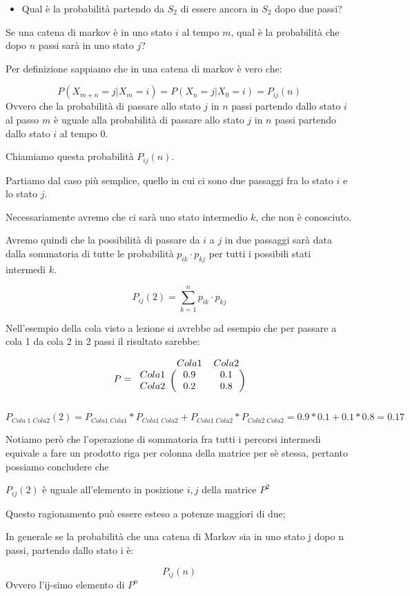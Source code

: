 \documentclass{article}
\begin{document}
\begin{itemize}
	\item Qual è la probabilità partendo da $S_2$ di essere ancora in $S_2$ dopo due passi?
\end{itemize}

\pagebreak
\begin{mdframed}[hidealllines=true,backgroundcolor=blue!20]
	Se una catena di markov è in uno stato $i$ al tempo $m$, qual è la probabilità che dopo $n$ passi sarà in uno stato $j$?
	
	Per definizione sappiamo che in una catena di markov è vero che:
	
	\[
		P(X_{m + n} = j | X_m = i) = P(X_{n} = j | X_0 = i) = P_{ij}(n)
	\]
	Ovvero che la probabilità di passare allo stato $j$ in $n$ passi partendo dallo stato $i$ al passo $m$ è uguale alla probabilità di passare allo stato $j$ in $n$ passi partendo dallo stato $i$ al tempo $0$.
	
	Chiamiamo questa probabilità $P_{ij}(n)$.
	
	Partiamo dal caso più semplice, quello in cui ci sono due passaggi fra lo stato $i$ e lo stato $j$.
	
	Necessariamente avremo che ci sarà uno stato intermedio $k$, che non è conosciuto.
	
	Avremo quindi che la possibilità di passare da $i$ a $j$ in due passaggi sarà data dalla sommatoria di tutte le probabilità $p_{ik} \cdot p_{kj}$ per tutti i possibili stati intermedi $k$.
	
	\[
		P_{ij}(2) = \sum_{k=1}^{n} p_{ik} \cdot p_{kj}
	\]
	
	Nell'esempio della cola visto a lezione si avrebbe ad esempio che per passare a cola 1 da cola 2 in 2 passi il risultato sarebbe:
	
	
	\[
	P = 
	\begin{blockarray}{ccc}
		& Cola  1 & Cola 2 \\
		\begin{block}{c(cc)}
			Cola 1  &  0.9   & 0.1 \\
			Cola 2  &  0.2   & 0.8 \\
		\end{block}
	\end{blockarray}
	\]
	
	\[
	 P_{Cola \; 1\; Cola 2}(2) = P_{Cola1 \; Cola1} * P_{Cola1 \; Cola2} + P_{Cola1 \; Cola2} * P_{Cola2 \; Cola2} = 
	 0.9 * 0.1 + 0.1 * 0.8 = 0.17
	\]
	
	Notiamo però che l'operazione di sommatoria fra tutti i percorsi intermedi equivale a fare un prodotto riga per colonna della matrice per sè stessa, pertanto possiamo concludere che
	
	$P_{ij}(2)$ è uguale all'elemento in posizione $i,j$ della matrice $P^2$
	
	Questo ragionamento può essere esteso a potenze maggiori di due;
	
	In generale se la probabilità che una catena di Markov sia in uno stato j dopo n passi, partendo dallo stato i è:
	
	\[
		P_{ij}(n)
	\]
	Ovvero l'ij-simo elemento di $P^n$
\end{mdframed}
\end{document}
